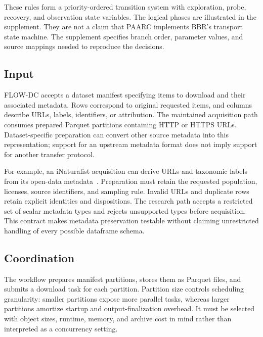 These rules form a priority-ordered transition system with exploration, probe, recovery, and observation state variables. The logical phases are illustrated in the supplement. They are not a claim that PAARC implements BBR's transport state machine. The supplement specifies branch order, parameter values, and source mappings needed to reproduce the decisions.

\subsection{Input}
FLOW-DC accepts a dataset manifest specifying items to download and their associated metadata. Rows correspond to original requested items, and columns describe URLs, labels, identifiers, or attribution. The maintained acquisition path consumes prepared Parquet partitions containing HTTP or HTTPS URLs. Dataset-specific preparation can convert other source metadata into this representation; support for an upstream metadata format does not imply support for another transfer protocol.

For example, an iNaturalist acquisition can derive URLs and taxonomic labels from its open-data metadata~\cite{inat,inat-open}. Preparation must retain the requested population, licenses, source identifiers, and sampling rule. Invalid URLs and duplicate rows retain explicit identities and dispositions. The research path accepts a restricted set of scalar metadata types and rejects unsupported types before acquisition. This contract makes metadata preservation testable without claiming unrestricted handling of every possible dataframe schema.

\subsection{Coordination}
The workflow prepares manifest partitions, stores them as Parquet files, and submits a download task for each partition. Partition size controls scheduling granularity: smaller partitions expose more parallel tasks, whereas larger partitions amortize startup and output-finalization overhead. It must be selected with object sizes, runtime, memory, and archive cost in mind rather than interpreted as a concurrency setting.

